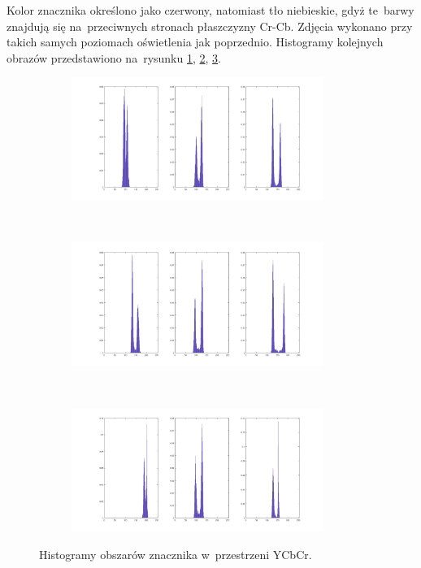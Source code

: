 Kolor znacznika określono jako czerwony, natomiast tło niebieskie, gdyż te~barwy znajdują się na~przeciwnych stronach płaszczyzny Cr-Cb. 
Zdjęcia wykonano przy takich samych poziomach oświetlenia jak poprzednio. 
Histogramy kolejnych obrazów przedstawiono na~rysunku \ref{fig:ycbcr_hist1}, \ref{fig:ycbcr_hist2}, \ref{fig:ycbcr_hist3}. 
\begin{figure}
	\centering
	\begin{subfigure}{\textwidth}
		\centering
		\includegraphics[width=0.9\textwidth]{ycbcr_hist1.jpg}
		\caption{}
		\label{fig:ycbcr_hist1}
	\end{subfigure}\\
	\begin{subfigure}{\textwidth}
		\centering
		\includegraphics[width=0.9\textwidth]{ycbcr_hist2.jpg}
		\caption{}
		\label{fig:ycbcr_hist2}
	\end{subfigure}\\
	\begin{subfigure}{\textwidth}
		\centering
		\includegraphics[width=0.9\textwidth]{ycbcr_hist3.jpg}
		\caption{}
		\label{fig:ycbcr_hist3}
	\end{subfigure}
	\caption{Histogramy obszarów znacznika w~przestrzeni YCbCr.}
	\label{fig:histogramy_ycbcr}
\end{figure}

